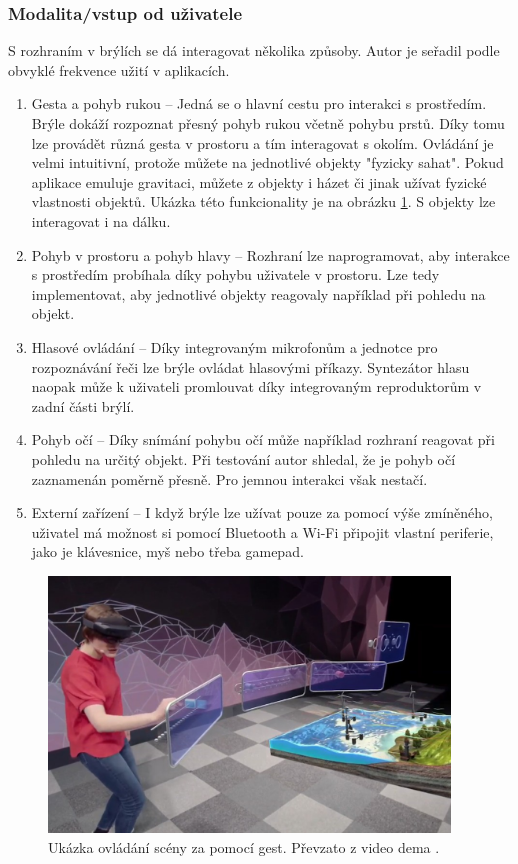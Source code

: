 \subsubsection{Modalita/vstup od uživatele}
S rozhraním v brýlích se dá interagovat několika způsoby. Autor je seřadil podle obvyklé frekvence užití v aplikacích.
\begin{enumerate}
    \item Gesta a pohyb rukou -- Jedná se o hlavní cestu pro interakci s prostředím. Brýle dokáží rozpoznat přesný pohyb rukou včetně pohybu prstů. Díky tomu lze provádět různá gesta v prostoru a tím interagovat s okolím. Ovládání je velmi intuitivní, protože můžete na jednotlivé objekty "fyzicky sahat". Pokud  aplikace emuluje gravitaci, můžete z objekty i házet či jinak užívat fyzické vlastnosti objektů. Ukázka této funkcionality je na obrázku \ref{pic:hololens2Demo}. S objekty lze interagovat i na dálku.
   \item Pohyb v prostoru a pohyb hlavy -- Rozhraní lze naprogramovat, aby interakce s prostředím probíhala díky pohybu uživatele v prostoru. Lze tedy implementovat, aby jednotlivé objekty reagovaly například při pohledu na objekt. 
    \item Hlasové ovládání -- Díky integrovaným mikrofonům a jednotce pro rozpoznávání řeči lze brýle ovládat hlasovými příkazy. Syntezátor hlasu naopak může k uživateli promlouvat díky integrovaným reproduktorům v zadní části brýlí.
    \item Pohyb očí -- Díky snímání pohybu očí může například rozhraní reagovat při pohledu na určitý objekt. Při testování autor shledal, že je pohyb očí zaznamenán poměrně přesně. Pro jemnou interakci však nestačí.
 
    \item Externí zařízení -- I když brýle lze užívat pouze za pomocí výše zmíněného, uživatel má možnost si pomocí Bluetooth a Wi-Fi připojit vlastní periferie, jako je klávesnice, myš nebo třeba gamepad. 
\end{enumerate}
\begin{figure}[ht] 
	\centering
	\includegraphics[width=0.95\textwidth]{obrazky-figures/ar/hololensDemo.png}
	\caption{Ukázka ovládání scény za pomocí gest. Převzato z video dema \cite{hololens2videoDemo}.}
	\label{pic:hololens2Demo}
\end{figure}

